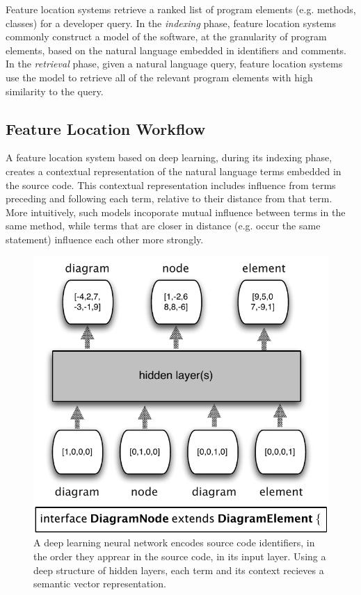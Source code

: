
%      
%

Feature location systems retrieve a ranked list of program elements
(e.g. methods, classes) for a developer query. In the {\em indexing}
phase, feature location systems commonly construct a model of the
software, at the granularity of program elements, based on the natural
language embedded in identifiers and comments. In the {\em retrieval}
phase, given a natural language query, feature location systems use
the model to retrieve all of the relevant program elements with high
similarity to the query.

\subsection{Feature Location Workflow}

A feature location system based on deep learning, during its indexing
phase, creates a contextual representation of the natural language
terms embedded in the source code. This contextual representation
includes influence from terms preceding and following each term,
relative to their distance from that term. More intuitively, such
models incoporate mutual influence between terms in the same method,
while terms that are closer in distance (e.g. occur the same
statement) influence each other more strongly. 



\begin{figure}[tb]
\centering
\includegraphics[width=.9\columnwidth]{figures/neuralnet.pdf}
\caption{A deep learning neural network encodes source code identifiers,
in the order they apprear in the source code, in its input
layer. Using a deep structure of hidden layers, each term and its
context recieves a semantic vector representation.}
\label{figure:miningworkflow}
\end{figure}



